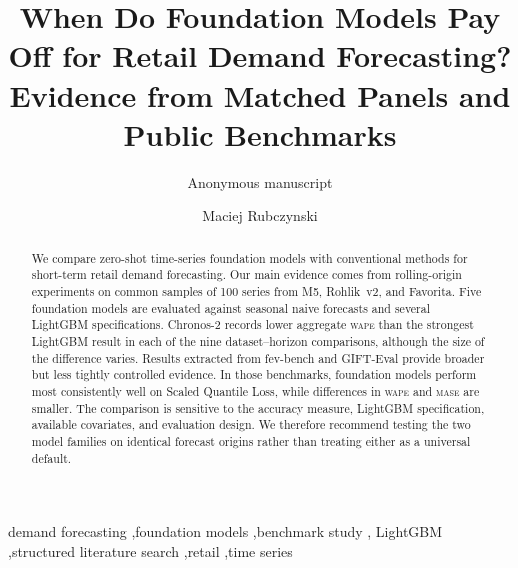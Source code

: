 \documentclass[preprint,12pt,authoryear]{elsarticle}
\newcommand{\WAPE}{\textnormal{\textsc{wape}}}
\newcommand{\MASE}{\textnormal{\textsc{mase}}}
\begin{document}
\begin{frontmatter}

\title{When Do Foundation Models Pay Off for Retail Demand Forecasting?\\
Evidence from Matched Panels and Public Benchmarks}

\ifdefined\anonymoussubmission
\author{Anonymous manuscript}
\else
\author[inst1]{Maciej Rubczynski}
\fi

\begin{abstract}
We compare zero-shot time-series foundation models with conventional methods
for short-term retail demand forecasting. Our main evidence comes from
rolling-origin experiments on common samples of 100 series from M5,
Rohlik~v2, and Favorita. Five foundation models are evaluated against seasonal
naive forecasts and several LightGBM specifications. Chronos-2 records lower
aggregate \WAPE{} than the strongest LightGBM result in each of the nine
dataset--horizon comparisons, although the size of the difference varies.
Results extracted from fev-bench and GIFT-Eval provide broader but less tightly
controlled evidence. In those benchmarks, foundation models perform most
consistently well on Scaled Quantile Loss, while differences in \WAPE{} and
\MASE{} are smaller. The comparison is sensitive to the accuracy measure,
LightGBM specification, available covariates, and evaluation design. We
therefore recommend testing the two model families on identical forecast
origins rather than treating either as a universal default.
\end{abstract}

\begin{keyword}
demand forecasting \sep foundation models \sep benchmark study \sep
LightGBM \sep structured literature search \sep retail \sep time series
\end{keyword}

\end{frontmatter}











\appendix







\end{document}
